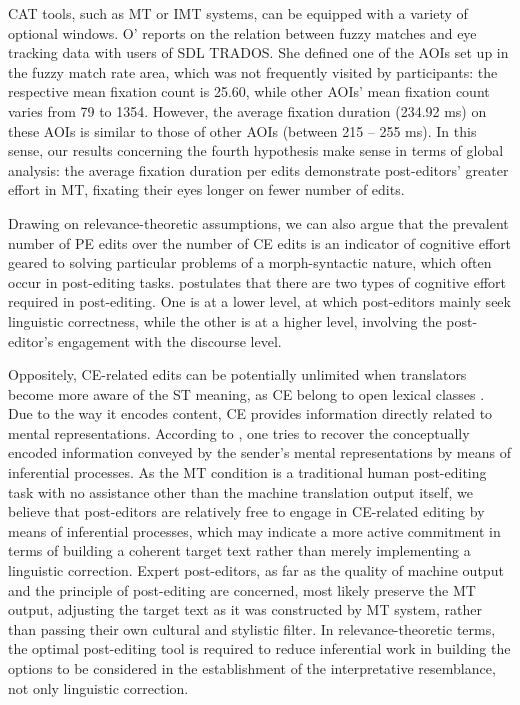 \documentclass[output=paper]{langsci/langscibook}
\begin{document}
CAT tools, such as MT or IMT systems, can be equipped with a variety of optional windows. O’\citet{Brien2008} reports on the relation between fuzzy matches and eye tracking data with users of SDL TRADOS. She defined one of the AOIs set up in the fuzzy match rate area, which was not frequently visited by participants: the respective mean fixation count is 25.60, while other AOIs’ mean fixation count varies from 79 to 1354. However, the average fixation duration (234.92 ms) on these AOIs is similar to those of other AOIs (between 215 – 255 ms). In this sense, our results concerning the fourth hypothesis make sense in terms of global analysis: the average fixation duration per edits demonstrate post-editors’ greater effort in MT, fixating their eyes longer on fewer number of edits. 



Drawing on relevance-theoretic assumptions, we can also argue that the prevalent number of PE edits over the number of CE edits is an indicator of cognitive effort geared to solving particular problems of a morph-syntactic nature, which often occur in post-editing tasks. \citet{Krings2001} postulates that there are two types of cognitive effort required in post-editing. One is at a lower level, at which post-editors mainly seek linguistic correctness, while the other is at a higher level, involving the post-editor’s engagement with the discourse level.  



Oppositely, CE-related edits can be potentially unlimited when translators become more aware of the ST meaning, as CE belong to open lexical classes \citep{Moeschler1998}. Due to the way it encodes content, CE provides information directly related to mental representations. According to \citet{Alves2001}, one tries to recover the conceptually encoded information conveyed by the sender’s mental representations by means of inferential processes. As the MT condition is a traditional human post-editing task with no assistance other than the machine translation output itself, we believe that post-editors are relatively free to engage in CE-related editing by means of inferential processes, which may indicate a more active commitment in terms of building a coherent target text rather than merely implementing a linguistic correction. Expert post-editors, as far as the quality of machine output and the principle of post-editing are concerned, most likely preserve the MT output, adjusting the target text as it was constructed by MT system, rather than passing their own cultural and stylistic filter. In relevance-theoretic terms, the optimal post-editing tool is required to reduce inferential work in building the options to be considered in the establishment of the interpretative resemblance, not only linguistic correction. 
\end{document}
